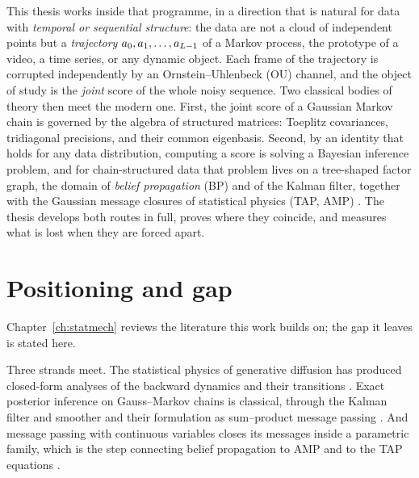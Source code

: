 This thesis works inside that programme, in a direction that is natural
for data with \emph{temporal or sequential structure}: the data are not
a cloud of independent points but a \emph{trajectory}
$a_0, a_1, \dots, a_{L-1}$ of a Markov process, the prototype of a
video, a time series, or any dynamic object. Each frame of the
trajectory is corrupted independently by an Ornstein--Uhlenbeck (OU)
channel, and the object of study is the \emph{joint} score of the whole
noisy sequence. Two classical bodies of theory then meet the modern one.
First, the joint score of a Gaussian Markov chain is governed by the
algebra of structured matrices: Toeplitz covariances, tridiagonal
precisions, and their common eigenbasis. Second, by an identity that
holds for any data distribution, computing a score is solving a Bayesian
inference problem, and for chain-structured data that problem lives on a
tree-shaped factor graph, the domain of \emph{belief propagation} (BP)
and of the Kalman filter, together with the Gaussian message closures
of statistical physics (TAP, AMP)
\citep{pearl1988probabilistic, mezard2009information, kalman1960new,
donoho2009message}. The thesis develops both routes in full, proves
where they coincide, and measures what is lost when they are forced
apart.

\section{Positioning and gap}

Chapter~\ref{ch:statmech} reviews the literature this work builds on; the gap
it leaves is stated here.

Three strands meet. The statistical physics of generative diffusion has
produced closed-form analyses of the backward dynamics and their transitions
\citep{biroli2023generative, biroli2024dynamical, achilli2026speciation,
sclocchi2025phase, bonnaire2025memorize}. Exact posterior inference on
Gauss--Markov chains is classical, through the Kalman filter and smoother and
their formulation as sum--product message passing
\citep{kalman1960new, rauch1965maximum, kschischang2001factor,
mezard2009information}. And message passing with continuous variables closes
its messages inside a parametric family, which is the step connecting belief
propagation to AMP and to the TAP equations
\citep{thouless1977solution, donoho2009message, zdeborova2016statistical}.

